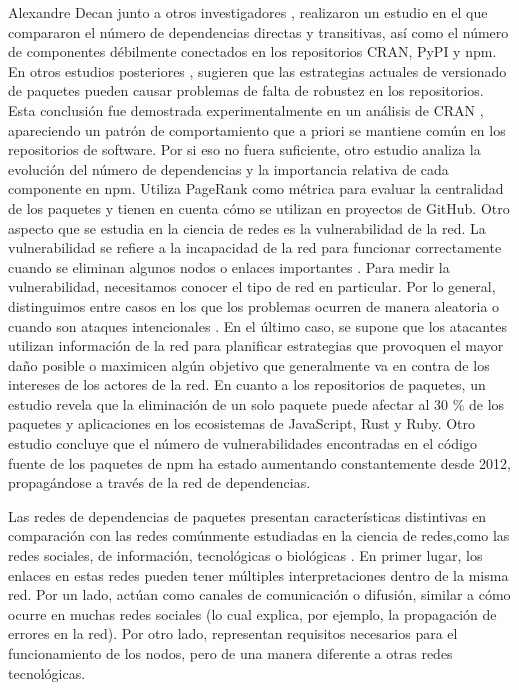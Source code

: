 Alexandre Decan junto a otros investigadores \cite{10.1145/2993412.3003382}, realizaron un estudio en el que compararon el número de dependencias
directas y transitivas, así como el número de componentes débilmente conectados en los repositorios CRAN, PyPI y npm.
En otros estudios posteriores \cite{10.1109/SANER.2017.7884604}, sugieren que las estrategias actuales de versionado de paquetes
pueden causar problemas de falta de robustez en los repositorios. Esta conclusión fue demostrada experimentalmente en un análisis de
CRAN \cite{10.1109/SANER.2016.12}, apareciendo un patrón de comportamiento que a priori se mantiene común en los repositorios de software.
Por si eso no fuera suficiente, otro estudio \cite{10.1145/2901739.2901743} analiza la evolución del número de dependencias y la importancia
relativa de cada componente en npm. Utiliza PageRank como métrica para evaluar la centralidad de los paquetes y tienen en cuenta cómo
se utilizan en proyectos de GitHub.
Otro aspecto que se estudia en la ciencia de redes es la vulnerabilidad de la red. La vulnerabilidad se refiere a la incapacidad de la
red para funcionar correctamente cuando se eliminan algunos nodos o enlaces importantes \cite{posfai2016network}. Para medir la vulnerabilidad,
necesitamos conocer el tipo de red en particular. Por lo general, distinguimos entre casos en los que los problemas ocurren de manera aleatoria
o cuando son ataques intencionales \cite{Albert2000}. En el último caso, se supone que los atacantes utilizan información de la red para
planificar estrategias que provoquen el mayor daño posible o maximicen algún objetivo que generalmente va en contra de los intereses de los
actores de la red.
En cuanto a los repositorios de paquetes, un estudio \cite{10.1145/2901739.2901743} revela que la eliminación de un solo paquete puede
afectar al 30 \% de los paquetes y aplicaciones en los ecosistemas de JavaScript, Rust y Ruby.
Otro estudio \cite{10.1145/3196398.3196401} concluye que el número de vulnerabilidades encontradas en el código fuente de los paquetes
de npm ha estado aumentando constantemente desde 2012, propagándose a través de la red de dependencias.


Las redes de dependencias de paquetes presentan características distintivas en comparación con las redes 
comúnmente estudiadas en la ciencia de redes,como las redes sociales, de información, tecnológicas o 
biológicas \cite{doi:10.1137/S003614450342480}.
En primer lugar, los enlaces en estas redes pueden tener múltiples interpretaciones dentro de la misma red.
Por un lado, actúan como canales de comunicación o difusión, similar a cómo ocurre en muchas redes sociales 
(lo cual explica, por ejemplo, la propagación de errores en la red). Por otro lado, representan requisitos 
necesarios para el funcionamiento de los nodos, pero de una manera diferente a otras redes tecnológicas.

